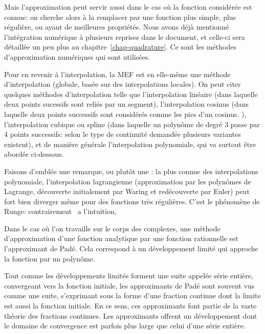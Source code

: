 Mais l'approximation peut servir aussi dans le cas où la fonction considérée est connue:
on cherche alors à la remplacer par une fonction plus simple, plus régulière, ou ayant de meilleures 
propriétés. 
Nous avons déjà mentionné l'intégration numérique à plusieurs reprises dans le document, et 
celle-ci sera détaillée un peu plus au chapitre~\ref{chap-quadrature}. Ce sont les méthodes d'approximation
numériques qui sont utilisées.

\medskip
Pour en revenir à l'interpolation, la MEF est en elle-même une méthode d'interpolation (globale,
basée sur des interpolations locales).
On peut citer quelques méthodes d'interpolation telle que l'interpolation linéaire (dans laquelle deux points
sucessifs sont reliés par un segment), l'interpolation cosinus (dans laquelle deux points successifs sont
considérés comme les pics d'un cosinus. ), l'interpolation cubique ou spline (dans laquelle un polynôme
de degré 3 passe par 4 points successifs: selon le type de continuité demandée plusieurs variantes
existent), et de manière générale l'interpolation polynomiale, qui va surtout être abordée
ci-dessous.

\medskip
Faisons d'emblée une remarque, ou plutôt une : 
la plus connue des interpolations polynomiale, l'interpolation lagrangienne (approximation par les 
polynômes de Lagrange, 
découverte initialement par Waring et redécouverte par 
Euler) peut fort bien diverger  même pour des fonctions 
très régulières.
C'est le phénomène de Runge: 
contrairement \ a l'intuition, 

\medskip
{} Dans le cas où l'on travaille sur le corps des complexes,  une méthode d'approximation 
d'une fonction analytique par une fonction rationnelle est l'approximant de Padé. 
Cela correspond à un développement limité qui approche la fonction par un polynôme.

Tout comme les développements limités forment une suite appelée série entière, convergeant
 vers la fonction initiale, les approximants de Padé sont souvent vus comme une suite, s'exprimant sous la forme 
d'une fraction continue dont la limite est aussi la fonction initiale. En ce sens, ces approximants font partie de 
la vaste théorie des fractions continues.
Les approximants offrent un développement dont le domaine de convergence est parfois plus large que celui 
d'une série entière. 

